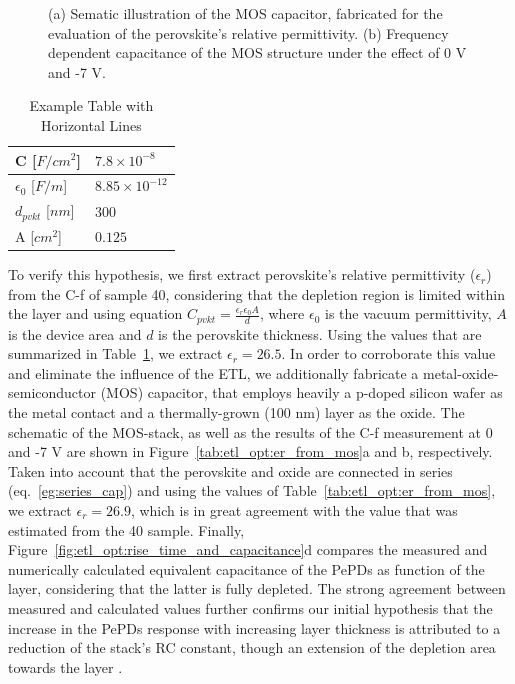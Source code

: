 \begin{figure}[htbp]
    \caption{(a) Sematic illustration of the MOS capacitor, fabricated for the evaluation of the perovskite's relative permittivity. (b) Frequency dependent capacitance of the MOS structure under the effect of 0 V and -7 V. }
    \label{}
\end{figure}


\begin{table}[htbp]
    \centering
    \renewcommand{\arraystretch}{1.5} %
    \begin{tabular}{@{} l l @{}}
        \hline
        C [$F/cm^2$] & $7.8\times10^{-8}$\\ \hline
        $\epsilon_0$ [$F/m$]& $8.85\times10^{-12}$ \\ \hline
        $d_{pvkt}$ [$nm$] & $300$ \\ \hline
        A [$cm^2$] & $0.125$ \\ \hline
    \end{tabular}
    \caption{Example Table with Horizontal Lines} %
    \label{tab:etl_opt:er_from_pepd} %
\end{table}

To verify this hypothesis, we first extract perovskite's relative permittivity ($\epsilon_r$) from the C-f of sample 40, considering that the depletion region is limited within the  layer and using equation $C_{pvkt} = \frac{\epsilon_r\epsilon_0A}{d}$, where $\epsilon_0$ is the vacuum permittivity, $A$ is the device area and $d$ is the perovskite thickness. Using the values that are summarized in Table~\ref{tab:etl_opt:er_from_pepd}, we extract $\epsilon_r = 26.5$. In order to corroborate this value and eliminate the influence of the ETL, we additionally fabricate a metal-oxide-semiconductor (MOS) capacitor, that employs heavily a p-doped silicon wafer as the metal contact and a thermally-grown  (100 nm) layer as the oxide. The schematic of the MOS-stack, as well as the results of the C-f measurement at 0 and -7 V are shown in Figure~\ref{tab:etl_opt:er_from_mos}a and b, respectively. Taken into account that the perovskite and oxide are connected in series (eq.~\ref{eg:series_cap}) and using the values of Table~\ref{tab:etl_opt:er_from_mos}, we extract $\epsilon_r = 26.9$, which is in great agreement with the value that was estimated from the 40 sample. Finally, Figure~\ref{fig:etl_opt:rise_time_and_capacitance}d compares the measured and numerically calculated equivalent capacitance of the PePDs as function of the  layer, considering that the latter is fully depleted. The strong agreement between measured and calculated values further confirms our initial hypothesis that the increase in the PePDs response with increasing  layer thickness is attributed to a reduction of the stack's RC constant, though an extension of the depletion area towards the  layer \cite{Goushcha2017OnPhotodiodes}. 

